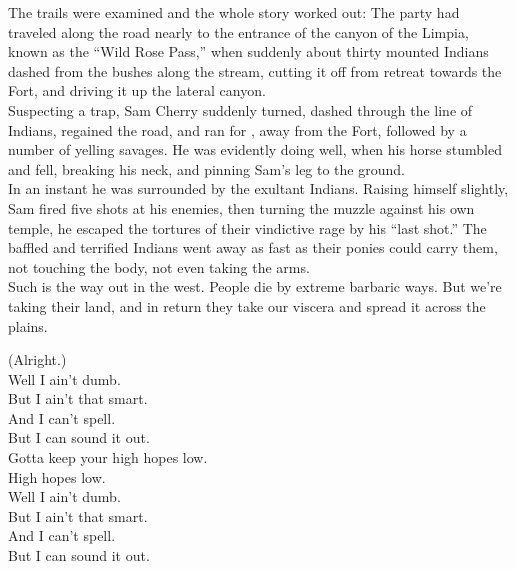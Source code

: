 The trails were examined and the whole story worked out: The party had traveled along the road nearly to the entrance of the canyon of the Limpia, known as the ``Wild Rose Pass,'' when suddenly about thirty mounted Indians dashed from the bushes along the stream, cutting it off from retreat towards the Fort, and driving it up the lateral canyon. \\

Suspecting a trap, Sam Cherry suddenly turned, dashed through the line of Indians, regained the road, and ran for , away from the Fort, followed by a number of yelling savages. He was evidently doing well, when his horse stumbled and fell, breaking his neck, and pinning Sam's leg to the ground. \\

In an instant he was surrounded by the exultant Indians. Raising himself slightly, Sam fired five shots at his enemies, then turning the muzzle against his own temple, he escaped the tortures of their vindictive rage by his ``last shot.'' The baffled and terrified Indians went away as fast as their ponies could carry them, not touching the body, not even taking the arms. \\

Such is the way out in the west. People die by extreme barbaric ways. But we're taking their land, and in return they take our viscera and spread it across the  plains. \\




(Alright.) \\

Well I ain't dumb. \\
But I ain't that smart. \\
And I can't spell. \\
But I can sound it out. \\

Gotta keep your high hopes low. \\

High hopes low. \\

Well I ain't dumb. \\
But I ain't that smart. \\
And I can't spell. \\
But I can sound it out. \\

